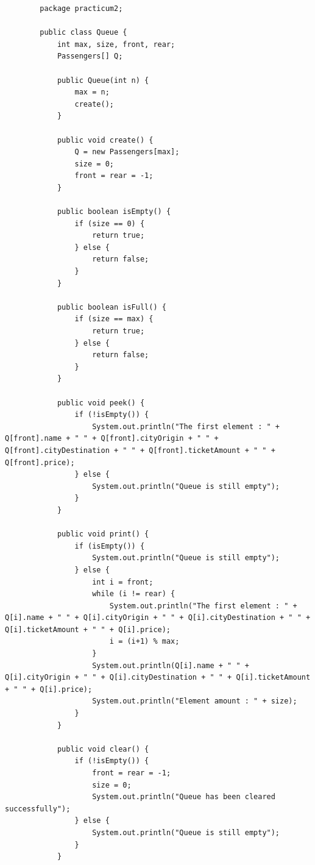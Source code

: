 \documentclass[12pt,titlepage]{article}
\begin{document}
\begin{enumerate}
    \begin{verbatim}
        package practicum2;
        
        public class Queue {
            int max, size, front, rear;
            Passengers[] Q;
            
            public Queue(int n) {
                max = n;
                create();
            }

            public void create() {
                Q = new Passengers[max];
                size = 0;
                front = rear = -1;
            }

            public boolean isEmpty() {
                if (size == 0) {
                    return true;
                } else {
                    return false;
                }
            }

            public boolean isFull() {
                if (size == max) {
                    return true;
                } else {
                    return false;
                }
            }

            public void peek() {
                if (!isEmpty()) {
                    System.out.println("The first element : " + Q[front].name + " " + Q[front].cityOrigin + " " + Q[front].cityDestination + " " + Q[front].ticketAmount + " " + Q[front].price);
                } else {
                    System.out.println("Queue is still empty");
                }
            }

            public void print() {
                if (isEmpty()) {
                    System.out.println("Queue is still empty");
                } else {
                    int i = front;
                    while (i != rear) {
                        System.out.println("The first element : " + Q[i].name + " " + Q[i].cityOrigin + " " + Q[i].cityDestination + " " + Q[i].ticketAmount + " " + Q[i].price);
                        i = (i+1) % max;
                    }
                    System.out.println(Q[i].name + " " + Q[i].cityOrigin + " " + Q[i].cityDestination + " " + Q[i].ticketAmount + " " + Q[i].price);
                    System.out.println("Element amount : " + size);
                }
            }

            public void clear() {
                if (!isEmpty()) {
                    front = rear = -1;
                    size = 0;
                    System.out.println("Queue has been cleared successfully");
                } else {
                    System.out.println("Queue is still empty");
                }
            }


\end{verbatim}
\end{enumerate}
\end{document}
